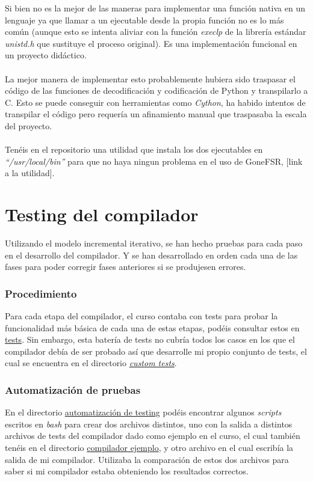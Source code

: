 Si bien no es la mejor de las maneras para implementar una función nativa en un lenguaje ya que llamar a un ejecutable desde la propia función no es lo más común (aunque esto se intenta aliviar con la función \textit{execlp} de la librería estándar \textit{unistd.h} que sustituye el proceso original). Es una implementación funcional en un proyecto didáctico.\\\\
La mejor manera de implementar esto probablemente hubiera sido traspasar el código de las funciones de decodificación y codificación de Python y transpilarlo a C. Esto se puede conseguir con herramientas como \textit{Cython}, ha habido intentos de transpilar el código pero requería un afinamiento manual que traspasaba la escala del proyecto.\\\\
Tenéis en el repositorio una utilidad que instala los dos ejecutables en \textit{``/usr/local/bin''} para que no haya ningun problema en el uso de GoneFSR, [link a la utilidad].
\section{Testing del compilador}
Utilizando el modelo incremental iterativo, se han hecho pruebas para cada paso en el desarrollo del compilador. Y se han desarrollado en orden cada una de las fases para poder corregir fases anteriores si se produjesen errores.
\\
\subsubsection{Procedimiento}
Para cada etapa del compilador, el curso contaba con tests para probar la funcionalidad más básica de cada una de estas etapas, podéis consultar estos en \href{https://github.com/domingoUnican/TFGPedroCastro/tree/main/code/compilerGoneFSR/Tests}{tests}. Sin embargo, esta batería de tests no cubría todos los casos en los que el compilador debía de ser probado así que desarrolle mi propio conjunto de tests, el cual se encuentra en el directorio \href{https://github.com/domingoUnican/TFGPedroCastro/tree/main/code/compilerGoneFSR/Tests}{\textit{custom tests}}.

\subsubsection{Automatización de pruebas}
En el directorio \href{https://github.com/domingoUnican/TFGPedroCastro/tree/main/code/compilerGoneFSR/automation-scripts}{automatización de testing} podéis encontrar algunos \textit{scripts} escritos en \textit{bash} para crear dos archivos distintos, uno con la salida a distintos archivos de tests del compilador dado como ejemplo en el curso, el cual también tenéis en el directorio \href{https://github.com/domingoUnican/TFGPedroCastro/tree/main/code/compilerGoneFSR/goner}{compilador ejemplo}, y otro archivo en el cual escribía la salida de mi compilador. Utilizaba la comparación de estos dos archivos para saber si mi compilador estaba obteniendo los resultados correctos.
